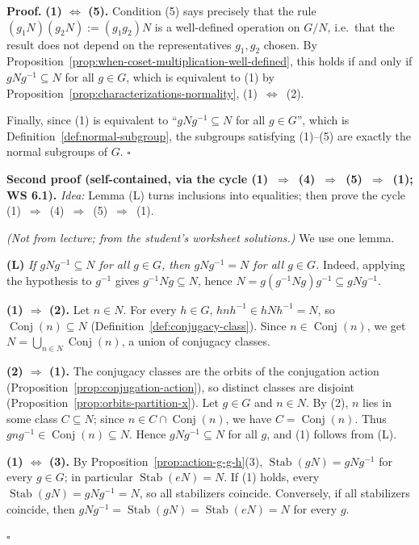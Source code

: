 \documentclass[11pt]{report}
\renewenvironment{proof}[1][Proof]{\noindent\textbf{#1.} }{\hfill$\square$\par\vspace{5pt}}
\begin{document}
\begin{proof}
\textbf{(1) $\Leftrightarrow$ (5).} Condition (5) says precisely that the rule $(g_1N)(g_2N) := (g_1g_2)N$ is a well-defined operation on $G/N$, i.e.\ that the result does not depend on the representatives $g_1, g_2$ chosen. By Proposition~\ref{prop:when-coset-multiplication-well-defined}, this holds if and only if $gNg^{-1} \subseteq N$ for all $g \in G$, which is equivalent to (1) by Proposition~\ref{prop:characterizations-normality}, (1)~$\Leftrightarrow$~(2).

Finally, since (1) is equivalent to ``$gNg^{-1} \subseteq N$ for all $g \in G$'', which is Definition~\ref{def:normal-subgroup}, the subgroups satisfying (1)--(5) are exactly the normal subgroups of $G$.
\end{proof}

\begin{proof}[Second proof (self-contained, via the cycle (1)~$\Rightarrow$~(4)~$\Rightarrow$~(5)~$\Rightarrow$~(1); WS 6.1)]
\textit{Idea:} Lemma (L) turns inclusions into equalities; then prove the cycle (1)~$\Rightarrow$~(4)~$\Rightarrow$~(5)~$\Rightarrow$~(1).\par
\textit{(Not from lecture; from the student's worksheet solutions.)} We use one lemma.

\textbf{(L)} \emph{If $gNg^{-1} \subseteq N$ for all $g \in G$, then $gNg^{-1} = N$ for all $g \in G$.} Indeed, applying the hypothesis to $g^{-1}$ gives $g^{-1}Ng \subseteq N$, hence $N = g(g^{-1}Ng)g^{-1} \subseteq gNg^{-1}$.

\textbf{(1) $\Rightarrow$ (2).} Let $n \in N$. For every $h \in G$, $hnh^{-1} \in hNh^{-1} = N$, so $\operatorname{Conj}(n) \subseteq N$ (Definition~\ref{def:conjugacy-class}). Since $n \in \operatorname{Conj}(n)$, we get $N = \bigcup_{n \in N} \operatorname{Conj}(n)$, a union of conjugacy classes.

\textbf{(2) $\Rightarrow$ (1).} The conjugacy classes are the orbits of the conjugation action (Proposition~\ref{prop:conjugation-action}), so distinct classes are disjoint (Proposition~\ref{prop:orbits-partition-x}). Let $g \in G$ and $n \in N$. By (2), $n$ lies in some class $C \subseteq N$; since $n \in C \cap \operatorname{Conj}(n)$, we have $C = \operatorname{Conj}(n)$. Thus $gng^{-1} \in \operatorname{Conj}(n) \subseteq N$. Hence $gNg^{-1} \subseteq N$ for all $g$, and (1) follows from (L).

\textbf{(1) $\Leftrightarrow$ (3).} By Proposition~\ref{prop:action-g-g-h}(3), $\operatorname{Stab}(gN) = gNg^{-1}$ for every $g \in G$; in particular $\operatorname{Stab}(eN) = N$. If (1) holds, every $\operatorname{Stab}(gN) = gNg^{-1} = N$, so all stabilizers coincide. Conversely, if all stabilizers coincide, then $gNg^{-1} = \operatorname{Stab}(gN) = \operatorname{Stab}(eN) = N$ for every $g$.


\end{proof}
\end{document}
